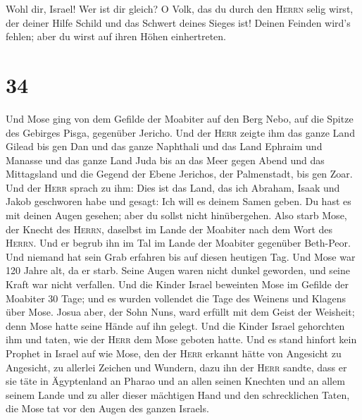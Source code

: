  Wohl dir, Israel! Wer ist dir gleich? O Volk, das du
durch den \textsc{Herrn} selig wirst, der deiner Hilfe Schild und das
Schwert deines Sieges ist! Deinen Feinden wird's fehlen; aber du wirst
auf ihren Höhen einhertreten.

\hypertarget{section-33}{%
\section{34}\label{section-33}}

 Und Mose ging von dem Gefilde der Moabiter auf den Berg
Nebo, auf die Spitze des Gebirges Pisga, gegenüber Jericho. Und der
\textsc{Herr} zeigte ihm das ganze Land Gilead bis gen Dan
 und das ganze Naphthali und das Land Ephraim und Manasse
und das ganze Land Juda bis an das Meer gegen Abend  und
das Mittagsland und die Gegend der Ebene Jerichos, der Palmenstadt, bis
gen Zoar.  Und der \textsc{Herr} sprach zu ihm: Dies ist
das Land, das ich Abraham, Isaak und Jakob geschworen habe und gesagt:
Ich will es deinem Samen geben. Du hast es mit deinen Augen gesehen;
aber du sollst nicht hinübergehen.  Also starb Mose, der
Knecht des \textsc{Herrn}, daselbst im Lande der Moabiter nach dem Wort
des \textsc{Herrn}.  Und er begrub ihn im Tal im Lande der
Moabiter gegenüber Beth-Peor. Und niemand hat sein Grab erfahren bis auf
diesen heutigen Tag.  Und Mose war 120 Jahre alt, da er
starb. Seine Augen waren nicht dunkel geworden, und seine Kraft war
nicht verfallen.  Und die Kinder Israel beweinten Mose im
Gefilde der Moabiter 30 Tage; und es wurden vollendet die Tage des
Weinens und Klagens über Mose.  Josua aber, der Sohn Nuns,
ward erfüllt mit dem Geist der Weisheit; denn Mose hatte seine Hände auf
ihn gelegt. Und die Kinder Israel gehorchten ihm und taten, wie der
\textsc{Herr} dem Mose geboten hatte.  Und es stand
hinfort kein Prophet in Israel auf wie Mose, den der \textsc{Herr}
erkannt hätte von Angesicht zu Angesicht,  zu allerlei
Zeichen und Wundern, dazu ihn der \textsc{Herr} sandte, dass er sie täte
in Ägyptenland an Pharao und an allen seinen Knechten und an allem
seinem Lande  und zu aller dieser mächtigen Hand und den
schrecklichen Taten, die Mose tat vor den Augen des ganzen Israels.
